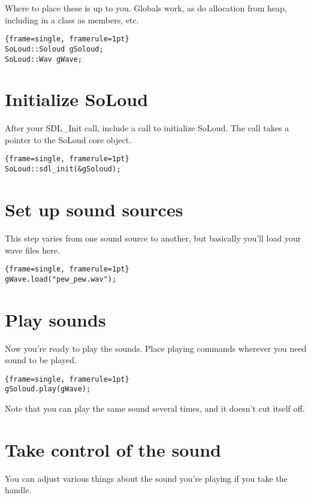 Where to place these is up to you. Globals work, as do allocation from heap, including in a class as members, etc.

\begin{lstlisting}{frame=single, framerule=1pt}
SoLoud::Soloud gSoloud;
SoLoud::Wav gWave;
\end{lstlisting}

\section{Initialize SoLoud}

After your SDL\_Init call, include a call to initialize SoLoud. The call takes a pointer to the SoLoud core object.

\begin{lstlisting}{frame=single, framerule=1pt}
SoLoud::sdl_init(&gSoloud);
\end{lstlisting}

\section{Set up sound sources}

This step varies from one sound source to another, but basically you'll load your wave files here.

\begin{lstlisting}{frame=single, framerule=1pt}
gWave.load("pew_pew.wav");
\end{lstlisting}

\section{Play sounds}

Now you're ready to play the sounds. Place playing commands wherever you need sound to be played.

\begin{lstlisting}{frame=single, framerule=1pt}
gSoloud.play(gWave);
\end{lstlisting}

Note that you can play the same sound several times, and it doesn't cut itself off.

\section{Take control of the sound}

You can adjust various things about the sound you're playing if you take the handle.

